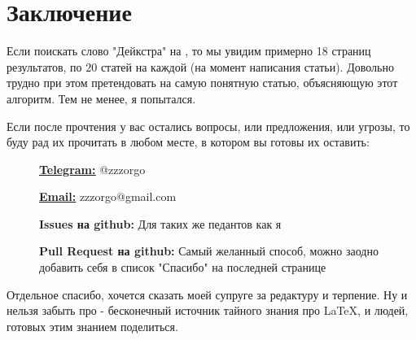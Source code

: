 \setlength{\headwidth}{145mm}
\vspace*{\fill}
\section*{Заключение}

Если поискать слово "Дейкстра" на , то мы увидим примерно 18 страниц результатов, по 20 статей на каждой (на момент написания статьи). Довольно трудно при этом претендовать на самую понятную статью, объясняющую этот алгоритм. Тем не менее, я попытался.

Если после прочтения у вас остались вопросы, или предложения, или угрозы, то буду рад их прочитать в любом месте, в котором вы готовы их оставить:

\begin{description}
    \item[]{\href{https://t.me/zzzorgo}{\bfseries \ul{Telegram:}} @zzzorgo}
    \item[]{\href{mailto:zzzorgo@gmail.com}{\bfseries \ul{Email:}} zzzorgo@gmail.com}
    \item[]{
        {\bfseries Issues на github:} Для таких же педантов как я
    }
    \item[]{
        {\bfseries Pull Request на github:} Самый желанный способ, можно заодно добавить себя в список "Спасибо" на последней странице
    }
\end{description}

Отдельное спасибо, хочется сказать моей супруге за редактуру и терпение. Ну и нельзя забыть про  - бесконечный источник тайного знания про \LaTeX, и людей, готовых этим знанием поделиться.

\vspace*{\fill}
\restoregeometry
\clearpage
